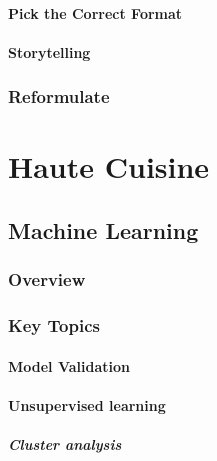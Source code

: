 \documentclass[
]{book}
\begin{document}
\hypertarget{pick-the-correct-format}{%
\subsection{Pick the Correct Format}\label{pick-the-correct-format}}

\hypertarget{storytelling}{%
\subsection{Storytelling}\label{storytelling}}

\hypertarget{reformulate-1}{%
\section{Reformulate}\label{reformulate-1}}

\hypertarget{part-haute-cuisine}{%
\part*{Haute Cuisine}\label{part-haute-cuisine}}

\hypertarget{machine-learning}{%
\chapter{Machine Learning}\label{machine-learning}}

\hypertarget{overview}{%
\section{Overview}\label{overview}}

\hypertarget{key-topics}{%
\section{Key Topics}\label{key-topics}}

\hypertarget{model-validation}{%
\subsection{Model Validation}\label{model-validation}}

\hypertarget{unsupervised-learning}{%
\subsection{Unsupervised learning}\label{unsupervised-learning}}

\hypertarget{cluster-analysis}{%
\subsubsection{Cluster analysis}\label{cluster-analysis}}
\end{document}
